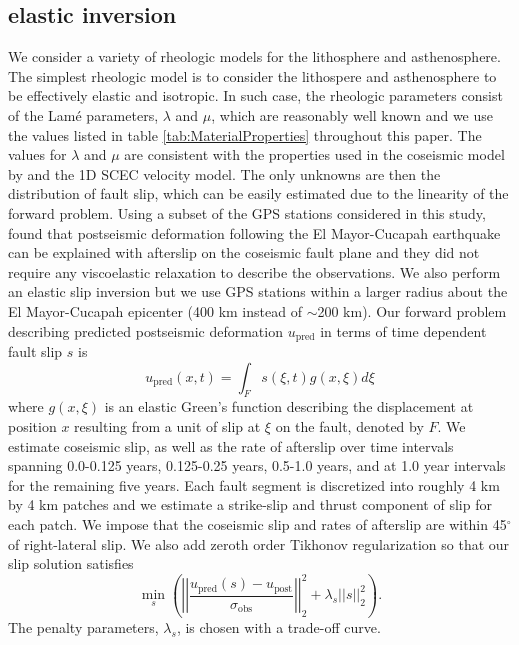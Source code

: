 \documentclass[1p]{elsarticle}
\begin{document}
\subsection{elastic inversion}\label{sec:ElasticInversion}    
We consider a variety of rheologic models for the lithosphere and asthenosphere. The simplest rheologic model is to consider the lithospere and asthenosphere to be effectively elastic and isotropic.  In such case, the rheologic parameters consist of the Lam\'e parameters, $\lambda$ and $\mu$, which are reasonably well known and we use the values listed in table \ref{tab:MaterialProperties} throughout this paper. The values for $\lambda$ and $\mu$ are consistent with the properties used in the coseismic model by \cite{Wei2011} and the 1D SCEC velocity model.  The only unknowns are then the distribution of fault slip, which can be easily estimated due to the linearity of the forward problem.  Using a subset of the GPS stations considered in this study, \citet{Rollins2015} found that postseismic deformation following the El Mayor-Cucapah earthquake can be explained with afterslip on the coseismic fault plane and they did not require any viscoelastic relaxation to describe the observations. We also perform an elastic slip inversion but we use GPS stations within a larger radius about the El Mayor-Cucapah epicenter (400 km instead of $\sim$200 km). Our forward problem describing predicted postseismic deformation $u_\mathrm{pred}$ in terms of time dependent fault slip $s$ is
\begin{equation}\label{eq:ElasticForward}
  u_\mathrm{pred}(x,t) = \int_F s(\xi,t)g(x,\xi)d\xi 
\end{equation}           
where $g(x,\xi)$ is an elastic Green's function describing the displacement at position $x$ resulting from a unit of slip at $\xi$ on the fault, denoted by $F$.
We estimate coseismic slip, as well as the rate of afterslip over time intervals spanning 0.0-0.125 years, 0.125-0.25 years, 0.5-1.0 years, and at 1.0 year intervals for the remaining five years.  Each fault segment is discretized into roughly 4 km by 4 km patches and we estimate a strike-slip and thrust component of slip for each patch.   We impose that the coseismic slip and rates of afterslip are within 45$^\circ$ of right-lateral slip. We also add zeroth order Tikhonov regularization so that our slip solution satisfies
\begin{equation}\label{eq:ElasticObjective}
  \min_s \left(\left|\left|\frac{u_\mathrm{pred}(s) - u_\mathrm{post}}                
                                {\sigma_\mathrm{obs}}\right|\right|_2^2 + 
                                \lambda_s||s||_2^2\right). 
\end{equation}
The penalty parameters, $\lambda_s$, is chosen with a trade-off curve. 
\end{document}
